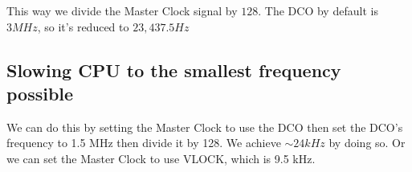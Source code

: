This way we divide the Master Clock signal by $128$.
The DCO by default is $3 MHz$, so it's reduced to $23,437.5 Hz$


\subsection{Slowing CPU to the smallest frequency possible}

We can do this by setting the Master Clock to use the DCO then set the DCO's frequency to 1.5 MHz then
divide it by 128. We achieve $\sim24 kHz$ by doing so.
Or we can set the Master Clock to use VLOCK, which is 9.5 kHz.